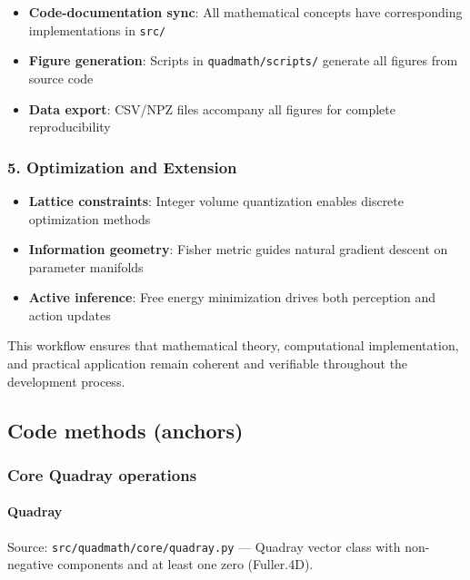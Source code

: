 \documentclass[
  10pt,
]{article}
\newcommand{\passthrough}[1]{#1}
\providecommand{\tightlist}{%
  \setlength{\itemsep}{0pt}\setlength{\parskip}{0pt}}
\renewcommand{\texttt}[1]{%
    \colorbox{codebg}{\color{codefg}\ttfamily #1}%
}
\begin{document}
\begin{itemize}
\tightlist
\item
  \textbf{Code-documentation sync}: All mathematical concepts have
  corresponding implementations in \passthrough{\lstinline!src/!}
\item
  \textbf{Figure generation}: Scripts in
  \passthrough{\lstinline!quadmath/scripts/!} generate all figures from
  source code
\item
  \textbf{Data export}: CSV/NPZ files accompany all figures for complete
  reproducibility
\end{itemize}

\subsubsection{5. Optimization and
Extension}\label{optimization-and-extension}

\begin{itemize}
\tightlist
\item
  \textbf{Lattice constraints}: Integer volume quantization enables
  discrete optimization methods
\item
  \textbf{Information geometry}: Fisher metric guides natural gradient
  descent on parameter manifolds
\item
  \textbf{Active inference}: Free energy minimization drives both
  perception and action updates
\end{itemize}

This workflow ensures that mathematical theory, computational
implementation, and practical application remain coherent and verifiable
throughout the development process.

\subsection{Code methods (anchors)}\label{code-methods-anchors}

\subsubsection{Core Quadray operations}\label{code:core_quadray}

\paragraph{\texorpdfstring{\texttt{Quadray}}{Quadray}}\label{code:Quadray}

Source: \passthrough{\lstinline!src/quadmath/core/quadray.py!} ---
Quadray vector class with non-negative components and at least one zero
(Fuller.4D).
\end{document}
